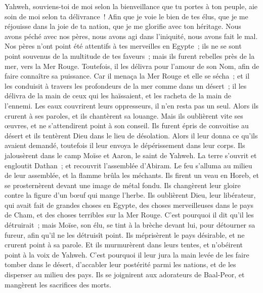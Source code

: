 \begin{multicols}{2}
Yahweh, souviens-toi de moi selon la bienveillance que tu portes à ton peuple, aie soin de moi selon ta délivrance~!
Afin que je voie le bien de tes élus, que je me réjouisse dans la joie de ta nation, que je me glorifie avec ton héritage.
Nous avons péché avec nos pères, nous avons agi dans l'iniquité, nous avons fait le mal.
Nos pères n'ont point été attentifs à tes merveilles en Egypte~; ils ne se sont point souvenus de la multitude de tes faveurs~; mais ils furent rebelles près de la mer, vers la Mer Rouge.
Toutefois, il les délivra pour l'amour de son Nom, afin de faire connaître sa puissance.
Car il menaça la Mer Rouge et elle se sécha~; et il les conduisit à travers les profondeurs de la mer comme dans un désert~;
il les délivra de la main de ceux qui les haïssaient, et les racheta de la main de l'ennemi.
Les eaux couvrirent leurs oppresseurs, il n'en resta pas un seul.
Alors ils crurent à ses paroles, et ils chantèrent sa louange.
Mais ils oublièrent vite ses œuvres, et ne s'attendirent point à son conseil.
Ils furent épris de convoitise au désert et ils tentèrent Dieu dans le lieu de désolation.
Alors il leur donna ce qu'ils avaient demandé, toutefois il leur envoya le dépérissement dans leur corps.
Ils jalousèrent dans le camp Moïse et Aaron, le saint de Yahweh.
La terre s'ouvrit et engloutit Dathan~; et recouvrit l'assemblée d'Abiram.
Le feu s'alluma au milieu de leur assemblée, et la flamme brûla les méchants.
Ils firent un veau en Horeb, et se prosternèrent devant une image de métal fondu.
Ils changèrent leur gloire contre la figure d'un bœuf qui mange l'herbe.
Ils oublièrent Dieu, leur libérateur, qui avait fait de grandes choses en Egypte,
des choses merveilleuses dans le pays de Cham, et des choses terribles sur la Mer Rouge.
C'est pourquoi il dit qu'il les détruirait~; mais Moïse, son élu, se tint à la brèche devant lui, pour détourner sa fureur, afin qu'il ne les détruisît point.
Ils méprisèrent le pays désirable, et ne crurent point à sa parole.
Et ils murmurèrent dans leurs tentes, et n'obéirent point à la voix de Yahweh.
C'est pourquoi il leur jura la main levée de les faire tomber dans le désert,
d'accabler leur postérité parmi les nations, et de les disperser au milieu des pays.
Ils se joignirent aux adorateurs de Baal-Peor, et mangèrent les sacrifices des morts.

\end{multicols}
